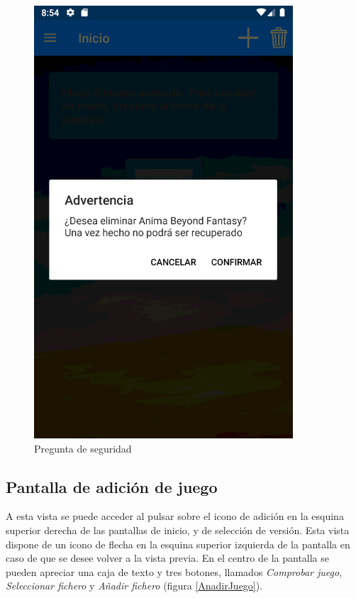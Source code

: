 \begin{figure}[H]
    \centering
    \includegraphics[scale=0.3]{Figures/Capturas/PreguntaSeguridad.png}
    \caption{Pregunta de seguridad}
    \label{PreguntaSeguridad}    
\end{figure}

\subsection{Pantalla de adición de juego}
A esta vista se puede acceder al pulsar sobre el icono de adición en la esquina superior derecha 
de las pantallas de inicio, y de selección de versión. Esta vista dispone de un icono de flecha en la esquina superior 
izquierda de la pantalla en caso de que se desee volver a la vista previa. En el centro de la pantalla se pueden apreciar 
una caja de texto y tres botones, llamados \textit{Comprobar juego}, \textit{Seleccionar fichero} y \textit{Añadir fichero} 
(figura \ref*{AnadirJuego}). 


